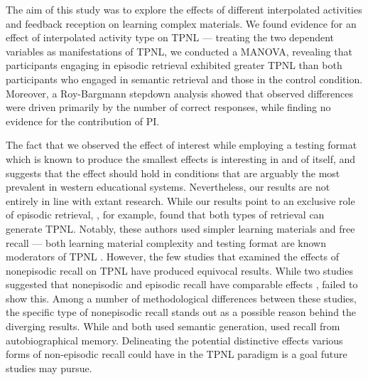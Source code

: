 \documentclass[../main.tex]{subfiles}
\begin{document}
The aim of this study was to explore the effects of different interpolated  
activities and feedback reception on learning complex materials. We found 
evidence for an effect of interpolated activity type on TPNL — treating the 
two dependent variables as manifestations of TPNL, we conducted a MANOVA, 
revealing that participants engaging in episodic retrieval exhibited greater 
TPNL than both participants who engaged in semantic retrieval and those in 
the control condition. Moreover, a Roy-Bargmann stepdown analysis showed 
that observed differences were driven primarily by the number of correct 
responses, while finding no evidence for the contribution of PI.

The fact that we observed the effect of interest while employing a testing 
format which is known to produce the smallest effects is interesting in and 
of itself, and suggests that the effect should hold in conditions that are 
arguably the most prevalent in western educational systems. Nevertheless, 
our results are not entirely in line with extant research. While our results 
point to an exclusive role of episodic retrieval, 
\cite{pastotterRetrievalLearningFacilitates2011}, for example, found 
that both types of retrieval can generate TPNL. Notably, these authors used 
simpler learning materials and free recall — both learning material 
complexity and testing format are known moderators of TPNL 
\citep{chanRetrievalPotentiatesNew2018}. However, the few studies that 
examined the effects of nonepisodic recall on TPNL have produced equivocal 
results. While two studies suggested that nonepisodic and episodic recall 
have comparable effects \citep{divisRetrievalSpeedsContext2014, 
pastotterRetrievalLearningFacilitates2011}, 
\cite{weinsteinNotAllRetrieval2015} failed to show this. Among a number of 
methodological differences between these studies, the specific type of 
nonepisodic recall stands out as a possible reason behind the diverging 
results. While \cite{pastotterRetrievalLearningFacilitates2011} and 
\cite{divisRetrievalSpeedsContext2014} both used semantic generation, 
\cite{weinsteinNotAllRetrieval2015} used recall from autobiographical 
memory. Delineating the potential distinctive effects various forms of 
non-episodic recall could have in the TPNL paradigm is a goal future studies 
may pursue.
\end{document}
